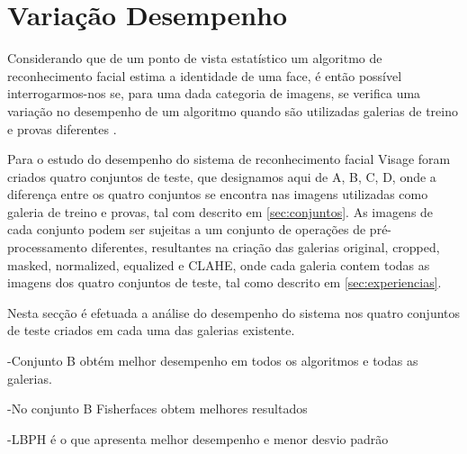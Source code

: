 \section{Variação Desempenho} \label{sec:variacaodesempenho}
Considerando que de um ponto de vista estatístico um algoritmo de reconhecimento facial estima a identidade de uma face, é então possível interrogarmos-nos se, para uma dada categoria de imagens, se verifica uma variação no desempenho de um algoritmo quando são utilizadas galerias de treino e provas diferentes \cite{Phillips2000}.

Para o estudo do desempenho do sistema de reconhecimento facial Visage foram criados quatro conjuntos de teste, que designamos aqui de A, B, C, D, onde a diferença entre os quatro conjuntos se encontra nas imagens utilizadas como galeria de treino e provas, tal com descrito em \ref{sec:conjuntos}. As imagens de cada conjunto podem ser sujeitas a um conjunto de operações de pré-processamento diferentes, resultantes na criação das galerias original, cropped, masked, normalized, equalized e CLAHE, onde cada galeria contem todas as imagens dos quatro conjuntos de teste, tal como descrito em \ref{sec:experiencias}.

Nesta secção é efetuada a análise do desempenho do sistema nos quatro conjuntos de teste criados em cada uma das galerias existente.

-Conjunto B obtém melhor desempenho em todos os algoritmos e todas as galerias.

-No conjunto B Fisherfaces obtem melhores resultados

-LBPH é o que apresenta melhor desempenho e menor desvio padrão

